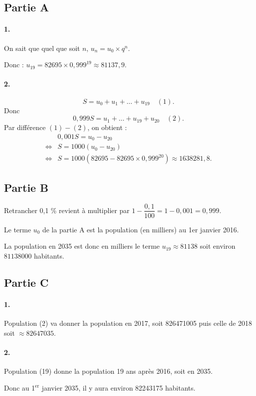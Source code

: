 \subsection*{Partie A}

\paragraph{1.} On sait que quel que soit \(n\), \( u_n = u_0 \times q^n \).

Donc : \(u_{19} = 82695 \times 0{,}999^{19} \approx 81137{,}9\).

\paragraph{2.}
\[
S = u_0 + u_1 + \dots + u_{19} \quad (1).
\]
Donc
\[
0{,}999S = u_1 + \dots + u_{19} + u_{20} \quad (2).
\]
Par différence \((1) - (2)\), on obtient :
\begin{align*}
&0{,}001S = u_0 - u_{20} \\
\iff &S = 1000(u_0 - u_{20}) \\
\iff &S = 1000(82695 - 82695 \times 0{,}999^{20}) \approx 1638281{,}8.
\end{align*}

\subsection*{Partie B}

Retrancher 0{,}1 \% revient à multiplier par \(1 - \dfrac{0{,}1}{100} = 1 - 0{,}001 = 0{,}999\).

Le terme \(u_0\) de la partie A est la population (en milliers) au 1er janvier 2016.

La population en 2035 est donc en milliers le terme \(u_19 \approx 81138 \) soit environ \(81138000\) habitants.

\subsection*{Partie C}

\paragraph{1.} Population (2) va donner la population en 2017, soit 826471005 puis celle de 2018 soit \( \approx 82647035 \).

\paragraph{2.} Population (19) donne la population 19 ans après 2016, soit en 2035. 
    
Donc au 1\(^\text{er}\) janvier 2035, il y aura environ 82243175 habitants.
